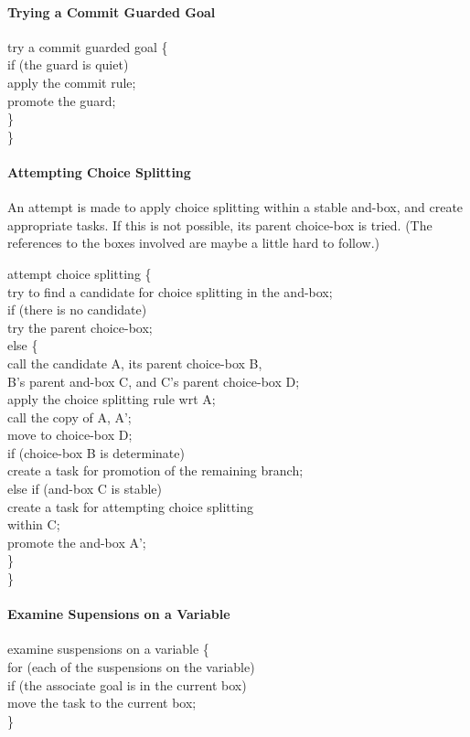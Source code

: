 \paragraph{Trying a Commit Guarded Goal}
\begin{program}
try a commit guarded goal \{\\
\>if (the guard is quiet)\\
\>\>apply the commit rule;\\
\>\>promote the guard;\\
\>\}\\
\}
\end{program}

\paragraph{Attempting Choice Splitting} An attempt is made to
apply choice splitting within a stable and-box, and create appropriate
tasks.  If this is not possible, its parent choice-box is tried.  (The
references to the boxes involved are maybe a little hard to follow.)
%
\begin{program}
attempt choice splitting \{\\
\>try to find a candidate for choice splitting in the and-box;\\
\>if (there is no candidate)\\
\>\>try the parent choice-box;\\
\>else \{\\
\>\>call the candidate A, its parent choice-box B,\\
\>\>\>B's parent and-box C, and C's parent choice-box D;\\
\>\>apply the choice splitting rule wrt A;\\
\>\>call the copy of A, A';\\
\>\>move to choice-box D;\\
\>\>if (choice-box B is determinate)\\
\>\>\>create a task for promotion of the remaining branch;\\
\>\>else if (and-box C is stable)\\
\>\>\>create a task for attempting choice splitting\\
\>\>\>\>within C;\\
\>\>promote the and-box A';\\
\>\}\\
\}
\end{program}

\paragraph{Examine Supensions on a Variable}
\begin{program}
examine suspensions on a variable \{\\
\>for (each of the suspensions on the variable)\\
\>\>if (the associate goal is in the current box)\\
\>\>\>move the task to the current box;\\
\}
\end{program}

